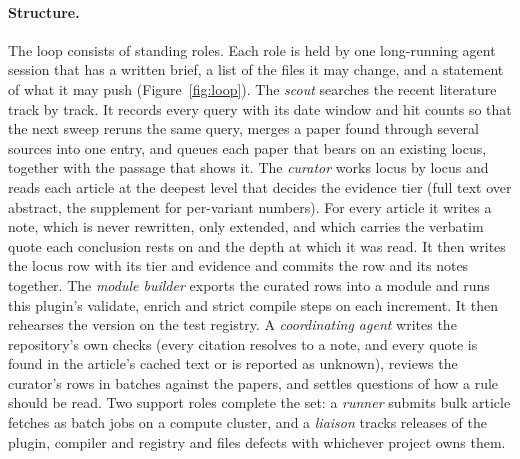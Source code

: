 \documentclass[11pt,a4paper]{article}
\begin{document}
\paragraph{Structure.} The loop consists of standing roles. Each role is held
by one long-running agent session that has a written brief, a list of the
files it may change, and a statement of what it may push
(Figure~\ref{fig:loop}). The \emph{scout} searches the recent literature track
by track. It records every query with its date window and hit counts so that
the next sweep reruns the same query, merges a paper found through several
sources into one entry, and queues each paper that bears on an existing locus,
together with the passage that shows it. The \emph{curator} works locus by
locus and reads each article at the deepest level that decides the evidence
tier (full text over abstract, the supplement for per-variant numbers). For
every article it writes a note, which is never rewritten, only extended, and
which carries the verbatim quote each conclusion rests on and the depth at
which it was read. It then writes the locus row with its tier and evidence and
commits the row and its notes together. The \emph{module builder} exports the
curated rows into a module and runs this plugin's validate, enrich and strict
compile steps on each increment. It then rehearses the version on the test
registry. A \emph{coordinating agent} writes the repository's own checks
(every citation resolves to a note, and every quote is found in the article's
cached text or is reported as unknown), reviews the curator's rows in batches
against the papers, and settles questions of how a rule should be read. Two
support roles complete the set: a \emph{runner} submits bulk article fetches
as batch jobs on a compute cluster, and a \emph{liaison} tracks releases of
the plugin, compiler and registry and files defects with whichever project
owns them.
\end{document}
